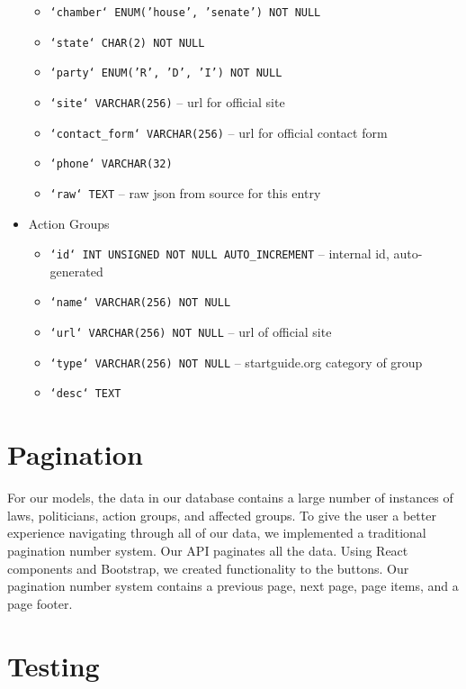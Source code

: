 \documentclass[12pt]{article}
\newcommand{\code}[1]{\texttt{#1}}
\begin{document}
\begin{itemize}
\begin{itemize}
		\item \code{`chamber` ENUM('house', 'senate') NOT NULL}
		\item \code{`state` CHAR(2) NOT NULL}
		\item \code{`party` ENUM('R', 'D', 'I') NOT NULL}
		\item \code{`site` VARCHAR(256)}						-- url for official site
		\item \code{`contact\_form` VARCHAR(256)}				-- url for official contact form
		\item \code{`phone` VARCHAR(32)}
		\item \code{`raw` TEXT}									-- raw json from source for this entry
	\end{itemize}
	\item[] Action Groups
	\begin{itemize}
		\item \code{`id` INT UNSIGNED NOT NULL AUTO\_INCREMENT}	-- internal id, auto-generated
		\item \code{`name` VARCHAR(256) NOT NULL}
		\item \code{`url` VARCHAR(256) NOT NULL}				-- url of official site
		\item \code{`type` VARCHAR(256) NOT NULL}				-- startguide.org category of group
		\item \code{`desc` TEXT}
	\end{itemize}
\end{itemize}


\section{Pagination}

For our models, the data in our database contains a large number of instances of laws, politicians, action groups, and affected groups. To give the user a better experience navigating through all of our data, we implemented a traditional pagination number system. Our API paginates all the data. Using React components and Bootstrap, we created functionality to the buttons. Our pagination number system contains a previous page, next page, page items, and a page footer.

\section{Testing}
\end{document}
